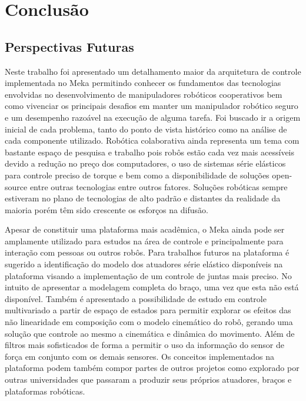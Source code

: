 \chapter{Conclusão} \label{ch:conclusoes}


\section{Perspectivas Futuras}

Neste trabalho foi apresentado um detalhamento maior da arquitetura de controle implementada no Meka permitindo conhecer os fundamentos das tecnologias envolvidas no desenvolvimento de manipuladores robóticos cooperativos bem como vivenciar os principais desafios em manter um manipulador robótico seguro e um desempenho razoável na execução de alguma tarefa. Foi buscado ir a origem inicial de cada problema, tanto do ponto de vista histórico como na análise de cada componente utilizado. Robótica colaborativa ainda representa um tema com bastante espaço de pesquisa e trabalho pois robôs estão cada vez mais acessíveis devido a redução no preço dos computadores, o uso de sistemas série elásticos para controle preciso de torque e bem como a disponibilidade de soluções open-source entre outras tecnologias entre outros fatores. Soluções robóticas sempre estiveram no plano de tecnologias de alto padrão e distantes da realidade da maioria porém têm sido crescente os esforços na difusão.

Apesar de constituir uma plataforma mais acadêmica, o Meka ainda pode ser amplamente utilizado para estudos na área de controle e principalmente para interação com pessoas ou outros robôs. Para trabalhos futuros na plataforma é sugerido a identificação do modelo dos atuadores série elástico disponíveis na plataforma visando a implementação de um controle de juntas mais preciso. No intuito de apresentar a modelagem completa do braço, uma vez que esta não está disponível. Também é apresentado a possibilidade de estudo em controle multivariado a partir de espaço de estados para permitir explorar os efeitos das não linearidade em composição com o modelo cinemático do robô, gerando uma solução que controle ao mesmo a cinemática e dinâmica do movimento. Além de filtros mais sofisticados de forma a permitir o uso da informação do sensor de força em conjunto com os demais sensores. Os conceitos implementados na plataforma podem também compor partes de outros projetos como explorado por outras universidades que passaram a produzir seus próprios atuadores, braços e plataformas robóticas.

